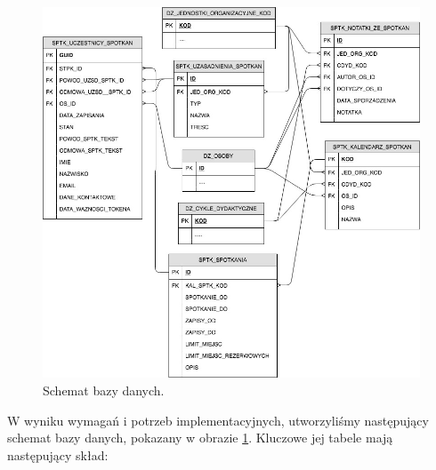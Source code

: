 \documentclass[licencjacka]{pracamgr}
\begin{document}
\begin{figure}[b!]
  \includegraphics[width=\linewidth]{schemat.jpg}
  \caption{Schemat bazy danych.}
  \label{fig:schemat}
\end{figure}

W wyniku wymagań i potrzeb implementacyjnych, utworzyliśmy następujący schemat bazy danych, pokazany w obrazie \ref{fig:schemat}. Kluczowe jej tabele mają następujący skład:
\end{document}

